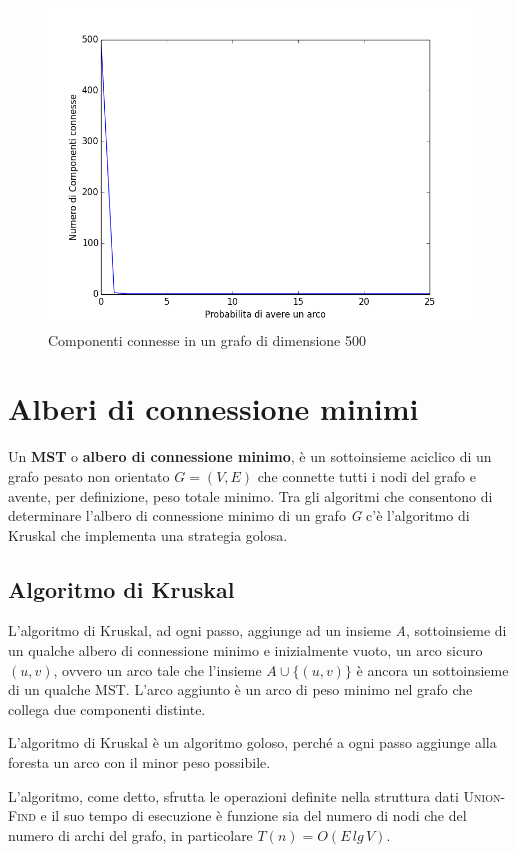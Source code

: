 \documentclass[11pt]{article}
\begin{document}
\newpage
\begin{figure}[h]
\centering
\includegraphics[scale=0.33,angle=0]{cc500.png}
\caption{Componenti connesse in un grafo di dimensione 500}
\label{cc500}
\end{figure}
\section{Alberi di connessione minimi}
Un \textbf{MST} o \textbf{albero di connessione minimo}, è un sottoinsieme aciclico di un grafo pesato non orientato $G = (V,E)$ che connette tutti i nodi del grafo e avente, per definizione, peso totale minimo. Tra gli algoritmi che consentono di determinare l'albero di connessione minimo di un grafo \textit{G} c'è l'algoritmo di Kruskal che implementa una strategia golosa.
\subsection{Algoritmo di Kruskal}
L'algoritmo di Kruskal, ad ogni passo, aggiunge ad un insieme \textit{A}, sottoinsieme di un qualche albero di connessione minimo e inizialmente vuoto, un arco sicuro $(u,v)$, ovvero un arco tale che l'insieme $A \cup \{(u,v)\}$ è ancora un sottoinsieme di un qualche MST. L'arco aggiunto è un arco di peso minimo nel grafo che collega due componenti distinte.

L'algoritmo di Kruskal è un algoritmo goloso, perché a ogni passo aggiunge alla foresta un arco con il minor peso possibile.

L'algoritmo, come detto, sfrutta le operazioni definite nella struttura dati \textsc{Union-Find} e il suo tempo di esecuzione è funzione sia del numero di nodi che del numero di archi del grafo, in particolare $T(n) = O(E\,lg\,V)$.
\end{document}
